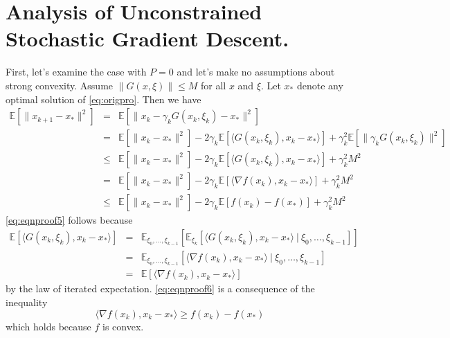 \section{Analysis of Unconstrained Stochastic Gradient Descent.}
First, let's examine the case with $P = 0$ and let's make no assumptions about strong convexity. Assume $\|G(x, \xi)\| \leq M$ for all $x$ and $\xi$. Let $x_*$ denote any optimal solution of \eqref{eq:origpro}. Then we have
\begin{eqnarray}
\mathbb{E}[\|x_{k+1}-x_*\|^2]&=&\mathbb{E}[\|x_{k}-\gamma_k G(x_k,\xi_k)-x_*\|^2]  \nonumber \\
&=&\mathbb{E}[\|x_{k}-x_*\|^2]- 2\gamma_k\mathbb{E}[\langle G(x_k,\xi_k), x_k-x_*\rangle ]+ \gamma_k^2 \mathbb{E}[\|\gamma_k G(x_k,\xi_k)\|^2] \nonumber \\
&\leq&\mathbb{E}[\|x_{k}-x_*\|^2]- 2\gamma_k\mathbb{E}[\langle G(x_k,\xi_k), x_k-x_*\rangle ]+ \gamma_k^2 M^2 \nonumber \\
&=&\mathbb{E}[\|x_{k}-x_*\|^2]- 2\gamma_k\mathbb{E}[\langle \nabla f(x_k), x_k-x_*\rangle ]+ \gamma_k^2 M^2 \label{eq:eqnproof5} \\
&\leq& \mathbb{E}[\|x_{k}-x_*\|^2]- 2\gamma_k\mathbb{E}[f(x_k)-f(x_*)]+ \gamma_k^2 M^2 \label{eq:eqnproof6}
\end{eqnarray}
\eqref{eq:eqnproof5} follows because
\begin{eqnarray}
\mathbb{E}[\langle G(x_k,\xi_k), x_k-x_*\rangle ]&=&\mathbb{E}_{\xi_0,\ldots,\xi_{k-1}}[\mathbb{E}_{\xi_k}[\langle G(x_k,\xi_k), x_k-x_*\rangle\ |\ \xi_0,\ldots,\xi_{k-1} ]] \nonumber\\
&=&\mathbb{E}_{\xi_0,\ldots,\xi_{k-1}}[\langle \nabla f(x_k), x_k-x_*\rangle\ |\ \xi_0,\ldots,\xi_{k-1} ] \\
&=&\mathbb{E}[\langle \nabla f(x_k), x_k-x_*\rangle]
\end{eqnarray}
by the law of iterated expectation. \eqref{eq:eqnproof6} is a consequence of the inequality
\begin{equation}
\langle \nabla f(x_k), x_k-x_*\rangle \geq f(x_k)-f(x_*)
\end{equation}
which holds because $f$ is convex.

